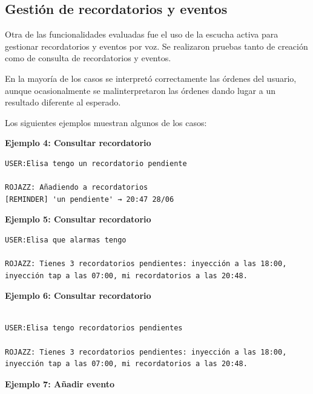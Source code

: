 \subsection{Gestión de recordatorios y eventos}

Otra de las funcionalidades evaluadas fue el uso de la escucha activa para gestionar recordatorios y eventos por voz. Se realizaron pruebas tanto de creación como de consulta de recordatorios y eventos.

En la mayoría de los casos se interpretó correctamente las órdenes del usuario, aunque ocasionalmente se malinterpretaron las órdenes dando lugar a un resultado diferente al esperado.

Los siguientes ejemplos muestran algunos de los casos:

\vspace{0.2cm}

\textbf{Ejemplo 4: Consultar recordatorio}

\begin{Verbatim}[breaklines=true]
USER:Elisa tengo un recordatorio pendiente

ROJAZZ: Añadiendo a recordatorios
[REMINDER] 'un pendiente' → 20:47 28/06
\end{Verbatim}

\vspace{0.2cm}

\textbf{Ejemplo 5: Consultar recordatorio}

\begin{Verbatim}[breaklines=true]
USER:Elisa que alarmas tengo

ROJAZZ: Tienes 3 recordatorios pendientes: inyección a las 18:00, inyección tap a las 07:00, mi recordatorios a las 20:48.
\end{Verbatim}

\vspace{0.2cm}

\textbf{Ejemplo 6: Consultar recordatorio}

\begin{Verbatim}[breaklines=true]

USER:Elisa tengo recordatorios pendientes

ROJAZZ: Tienes 3 recordatorios pendientes: inyección a las 18:00, inyección tap a las 07:00, mi recordatorios a las 20:48.
\end{Verbatim}

\vspace{0.2cm}

\textbf{Ejemplo 7: Añadir evento}

